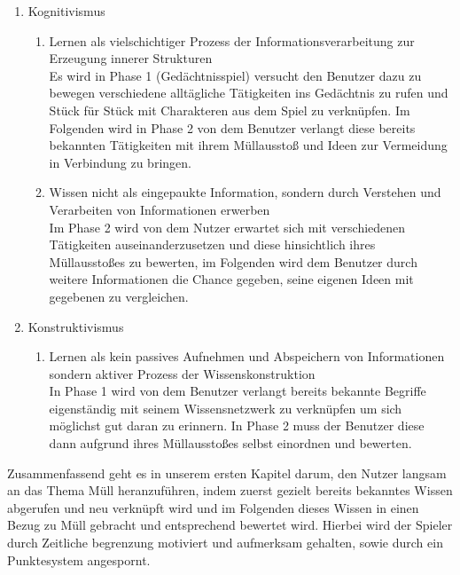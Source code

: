 \documentclass[a4paper]{article}
\begin{document}
\begin{enumerate}
\begin{enumerate}
\item Kognitivismus
  \begin{enumerate}
    \item Lernen als vielschichtiger Prozess der Informationsverarbeitung zur Erzeugung innerer Strukturen\\
    Es wird in Phase 1 (Gedächtnisspiel) versucht den Benutzer dazu zu bewegen verschiedene alltägliche Tätigkeiten ins Gedächtnis zu rufen und Stück für Stück mit Charakteren aus dem Spiel zu verknüpfen. Im Folgenden wird in Phase 2 von dem Benutzer verlangt diese bereits bekannten Tätigkeiten mit ihrem Müllausstoß und Ideen zur Vermeidung in Verbindung zu bringen.
    \item Wissen nicht als eingepaukte Information, sondern durch Verstehen und Verarbeiten von Informationen erwerben\\
    Im Phase 2 wird von dem Nutzer erwartet sich mit verschiedenen Tätigkeiten auseinanderzusetzen und diese hinsichtlich ihres Müllausstoßes zu bewerten, im Folgenden wird dem Benutzer durch weitere Informationen die Chance gegeben, seine eigenen Ideen mit gegebenen zu vergleichen.
  \end{enumerate}
  
\item Konstruktivismus
  \begin{enumerate}
    \item Lernen als kein passives Aufnehmen und Abspeichern von Informationen sondern aktiver Prozess der Wissenskonstruktion\\
    In Phase 1 wird von dem Benutzer verlangt bereits bekannte Begriffe eigenständig mit seinem Wissensnetzwerk zu verknüpfen um sich möglichst gut daran zu erinnern. In Phase 2 muss der Benutzer diese dann aufgrund ihres Müllausstoßes selbst einordnen und bewerten.
  \end{enumerate}

\end{enumerate}
            
Zusammenfassend geht es in unserem ersten Kapitel darum, den Nutzer langsam an das Thema Müll heranzuführen, indem zuerst gezielt bereits bekanntes Wissen abgerufen und neu verknüpft wird und im Folgenden dieses Wissen in einen Bezug zu Müll gebracht und entsprechend bewertet wird. Hierbei wird der Spieler durch Zeitliche begrenzung motiviert und aufmerksam gehalten, sowie durch ein Punktesystem angespornt.



\end{enumerate}
\end{document}

